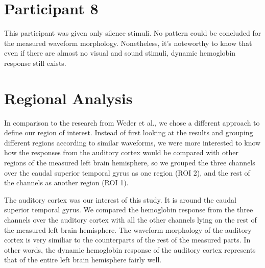 \section {Participant 8}
This participant was given only silence stimuli. No pattern could be concluded for the measured waveform morphology. Nonetheless, it's noteworthy to know that even if there are almost no visual and sound stimuli, dynamic hemoglobin response still exists.

\section {Regional Analysis}
In comparison to the research from Weder et al., we chose a different approach to define our region of interest. Instead of first looking at the results and grouping different regions according to similar waveforms, we were more interested to know how the responses from the auditory cortex would be compared with other regions of the measured left brain hemisphere, so we grouped the three channels over the caudal superior temporal gyrus as one region (ROI 2), and the rest of the channels as another region (ROI 1).

The auditory cortex was our interest of this study. It is around the caudal superior temporal gyrus. We compared the hemoglobin response from the three channels over the auditory cortex with all the other channels lying on the rest of the measured left brain hemisphere. The waveform morphology of the auditory cortex is very similiar to the counterparts of the rest of the measured parts. In other words, the dynamic hemoglobin response of the auditory cortex represents that of the entire left brain hemisphere fairly well.